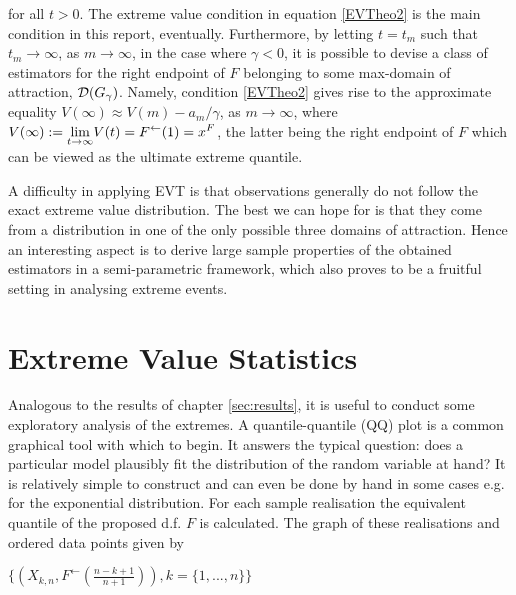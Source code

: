 \noindent for all $ t > 0 $. The extreme value condition in equation \ref{EVTheo2} is the main condition in this report, eventually. Furthermore, by letting $ t = t_m $ such that $ t_m \rightarrow \infty $, as $ m \rightarrow \infty $, in the case where $ \gamma < 0 $, it is possible to devise a class of estimators for the right endpoint of $F$ belonging to some max-domain of attraction, $ {\mathcal{D}} (G_\gamma) $.  Namely, condition \ref{EVTheo2} gives rise to the approximate equality $ V(\infty) \approx V(m) - a_m / \gamma $, as $ m \rightarrow \infty $, where $ V(\infty ) := \displaystyle {\lim_{t \rightarrow{\infty}}} V(t) = F^{\leftarrow}(1) = x^F $, the latter being the right endpoint of $F$ which can be viewed as the ultimate extreme quantile.



A difficulty in applying EVT is that observations generally do not follow the exact extreme value distribution. The best we can hope for is that they come from a distribution in one of the only possible three domains of attraction. Hence an interesting aspect is to derive large sample properties of the obtained estimators in a %
semi-parametric framework, which also proves to be a  fruitful setting in analysing extreme events. 


\section{Extreme Value Statistics} \label{subsec:EVres}

Analogous to the results of chapter \ref{sec:results}, it is useful to conduct some exploratory analysis of the extremes. A quantile-quantile (QQ) plot is a common graphical tool with which to begin. It answers the typical question: does a particular model plausibly fit the distribution of the random variable at hand? It is relatively simple to construct and can even be done by hand in some cases e.g. for the exponential distribution. For each sample realisation the equivalent quantile of the proposed d.f. $F$ is calculated. The graph of these realisations and ordered data points given by \newline
\centerline{$\{(X_{k,n},F^{\leftarrow}(\frac{n-k+1}{n+1})), k = \{1,...,n\}\}$}

